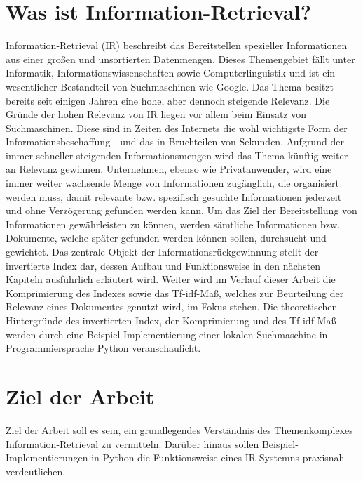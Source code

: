 \section{Was ist Information-Retrieval?}
Information-Retrieval (IR) beschreibt das Bereitstellen spezieller Informationen aus einer großen und unsortierten Datenmengen.
Dieses Themengebiet fällt unter Informatik, Informationswissenschaften sowie Computerlinguistik und ist ein wesentlicher Bestandteil von Suchmaschinen wie Google.
\newline
Das Thema besitzt bereits seit einigen Jahren eine hohe, aber dennoch steigende Relevanz. Die Gründe der hohen Relevanz von IR liegen vor allem beim Einsatz von Suchmaschinen. Diese sind in Zeiten des Internets die wohl wichtigste Form
der Informationsbeschaffung - und das in Bruchteilen von Sekunden. Aufgrund der immer schneller steigenden Informationsmengen wird das Thema künftig weiter an Relevanz gewinnen. Unternehmen, ebenso wie Privatanwender, wird eine immer weiter
wachsende Menge von Informationen zugänglich, die organisiert werden muss, damit relevante bzw. spezifisch gesuchte Informationen jederzeit und ohne Verzögerung gefunden werden kann.
\newline
Um das Ziel der Bereitstellung von Informationen gewährleisten zu können, werden sämtliche Informationen bzw. Dokumente, welche später gefunden werden können sollen, durchsucht und gewichtet.
Das zentrale Objekt der Informationsrückgewinnung stellt der invertierte Index dar, dessen Aufbau und Funktionsweise in den nächsten Kapiteln ausführlich erläutert wird.
Weiter wird im Verlauf dieser Arbeit die Komprimierung des Indexes sowie das Tf-idf-Maß, welches zur Beurteilung der Relevanz eines Dokumentes genutzt wird, im Fokus stehen.
\newline
Die theoretischen Hintergründe des invertierten Index, der Komprimierung und des Tf-idf-Maß werden durch eine Beispiel-Implementierung einer lokalen Suchmaschine in Programmiersprache Python veranschaulicht.

\section{Ziel der Arbeit}
Ziel der Arbeit soll es sein, ein grundlegendes Verständnis des Themenkomplexes Information-Retrieval zu vermitteln.
Darüber hinaus sollen Beispiel-Implementierungen in Python die Funktionsweise eines IR-Systemns praxisnah verdeutlichen.